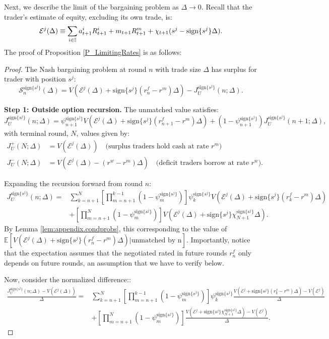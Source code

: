 Next, we describe the limit of the bargaining problem
as $\Delta\rightarrow0$. Recall that the trader's estimate of equity, excluding its own trade, is:
\[
\mathcal{E}^{j}(\Delta) \equiv \sum_{i\in\mathbb{I}}a_{t+1}^{i}R_{t+1}^{i}+m_{t+1}R_{t+1}^{m}+\chi_{t+1}(s^{j}-\text{sign}\{s^{j}\}\Delta).
\]
The proof of Proposition \ref{P_LimitingRates} is as follows:
\begin{proof}
The Nash bargaining problem at round $n$ with trade size $\Delta$ has surplus for trader with position $s^j$:
\[
\mathcal{S}_n^{\text{sign}\{s^j\}}(\Delta) = V(\mathcal{E}^j(\Delta) + \text{sign}\{s^j\}(r_n^f - r^m)\Delta) - J_U^{\text{sign}\{s^j\}}(n;\Delta).
\]

\textbf{Step 1: Outside option recursion.} The unmatched value satisfies:
\[
J_U^{\text{sign}\{s^j\}}(n;\Delta) = \psi_{n+1}^{\text{sign}\{s^j\}} V(\mathcal{E}^j(\Delta) + \text{sign}\{s^j\}(r_{n+1}^f - r^m)\Delta) + (1-\psi_{n+1}^{\text{sign}\{s^j\}})J_U^{\text{sign}\{s^j\}}(n+1;\Delta),
\]
with terminal round, $N$, values given by:
\begin{align*}
J_U^{+}(N;\Delta) &= V(\mathcal{E}^j(\Delta)) \quad \text{(surplus traders hold cash at rate } r^m\text{)}\\
J_U^{-}(N;\Delta) &= V(\mathcal{E}^j(\Delta) - (r^w - r^m)\Delta) \quad \text{(deficit traders borrow at rate } r^w\text{)}.
\end{align*}

Expanding the recursion forward from round $n$:
\begin{align*}
J_U^{\text{sign}\{s^j\}}(n;\Delta) = &\sum_{k=n+1}^{N} \left[\prod_{m=n+1}^{k-1}(1-\psi_m^{\text{sign}\{s^j\}})\right]\psi_k^{\text{sign}\{s^j\}} V(\mathcal{E}^j(\Delta) + \text{sign}\{s^j\}(r_k^f - r^m)\Delta)\\
&+ \left[\prod_{m=n+1}^{N}(1-\psi_m^{\text{sign}\{s^j\}})\right] V(\mathcal{E}^j(\Delta) + \text{sign}\{s^j\}\chi_{N+1}^{\text{sign}\{s^j\}}\Delta).
\end{align*}
By Lemma \ref{lem:appendix.condprobs}, this corresponding to the value of $\mathbb{E}\left[ V(\mathcal{E}^j(\Delta) + \text{sign}\{s^j\} (r^f_n - r^m)\Delta)|\text{unmatched by n} \right].$ Importantly, notice that the expectation assumes that the negotiated rated in future rounds $r^f_n$ only depends on future rounds, an assumption that we have to verify below.

Now, consider the normalized difference::
\begin{align*}
\frac{J_U^{\text{sign}\{s^j\}}(n;\Delta) - V(\mathcal{E}^j(\Delta))}{\Delta} = &\sum_{k=n+1}^{N} \left[\prod_{m=n+1}^{k-1}(1-\psi_m^{\text{sign}\{s^j\}})\right]\psi_k^{\text{sign}\{s^j\}} \frac{V(\mathcal{E}^j + \text{sign}\{s^j\}(r_k^f - r^m)\Delta) - V(\mathcal{E}^j)}{\Delta}\\
&+ \left[\prod_{m=n+1}^{N}(1-\psi_m^{\text{sign}\{s^j\}})\right] \frac{V(\mathcal{E}^j + \text{sign}\{s^j\}\chi_{N+1}^{\text{sign}\{s^j\}}\Delta) - V(\mathcal{E}^j)}{\Delta}.
\end{align*}


\end{proof}
